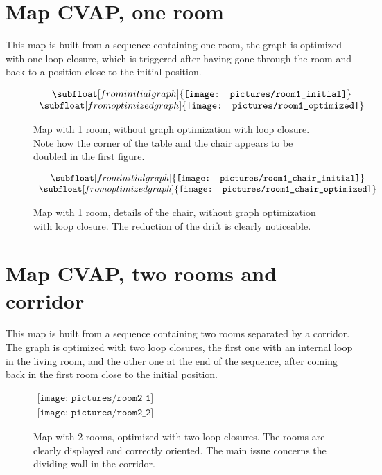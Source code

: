 \cleardoublepage
\section{Map CVAP, one room}

This map is built from a sequence containing one room, the graph is optimized with one loop closure, which is triggered after having gone through the room and back to a position close to the initial position. 

\begin{figure}[H]
\centering$
\begin{array}{c}
\subfloat[from initial graph]{\label{fig:room1_1}\texttt{[image: pictures/room1\_initial]}} \\
\subfloat[from optimized graph]{\label{fig:room1_2}\texttt{[image: pictures/room1\_optimized]}}
 \end{array}$
\caption{Map with 1 room,  \protect{} without graph optimization \protect{} with loop closure. Note how the corner of the table and the chair appears to be doubled in the first figure.}
\end{figure}

\begin{figure}[H]
\centering$
\begin{array}{c}
\subfloat[from initial graph]{\label{fig:room1_chair_1}\texttt{[image: pictures/room1\_chair\_initial]}} \\
\subfloat[from optimized graph]{\label{fig:room1_chair_2}\texttt{[image: pictures/room1\_chair\_optimized]}}
\end{array}$
\caption{Map with 1 room, details of the chair, \protect{} without graph optimization \protect{} with loop closure. The reduction of the drift is clearly noticeable.}
\end{figure}

\clearpage
\section{Map CVAP, two rooms and corridor}

This map is built from a sequence containing two rooms separated by a corridor. The graph is optimized with two loop closures, the first one with an internal loop in the living room, and the other one at the end of the sequence, after coming back in the first room close to the initial position. 

\begin{figure}[H]
\centering$
 \begin{array}{c}
 \texttt{[image: pictures/room2\_1]}\\
 \texttt{[image: pictures/room2\_2]}
 \end{array}$
\caption{Map with 2 rooms, optimized with two loop closures. The rooms are clearly displayed and correctly oriented. The main issue concerns the dividing wall in the corridor.}
\end{figure}

